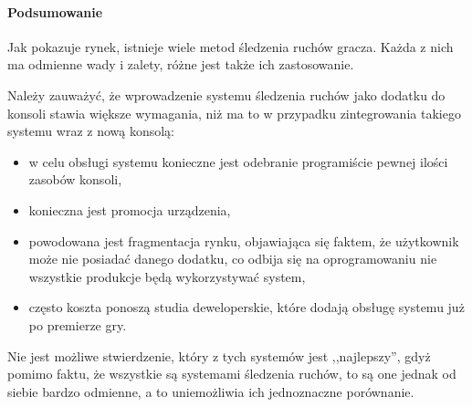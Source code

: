 \paragraph{Podsumowanie}
Jak pokazuje rynek, istnieje wiele metod śledzenia ruchów gracza. Każda z nich ma odmienne wady i zalety, różne jest także ich zastosowanie.

Należy zauważyć, że wprowadzenie systemu śledzenia ruchów jako dodatku do konsoli stawia większe wymagania, niż ma to w przypadku zintegrowania takiego systemu wraz z nową konsolą:
\begin{itemize}
  \item w celu obsługi systemu konieczne jest odebranie programiście pewnej ilości zasobów konsoli,
  \item konieczna jest promocja urządzenia,
  \item powodowana jest fragmentacja rynku, objawiająca się faktem, że użytkownik może nie posiadać danego dodatku, co odbija się na oprogramowaniu \ppauza nie wszystkie produkcje będą wykorzystywać system,
  \item często koszta ponoszą studia deweloperskie, które dodają obsługę systemu już po premierze gry.
\end{itemize}

Nie jest możliwe stwierdzenie, który z tych systemów jest ,,najlepszy'', gdyż pomimo faktu, że wszystkie są systemami śledzenia ruchów, to są one jednak od siebie bardzo odmienne, a to uniemożliwia ich jednoznaczne porównanie.

